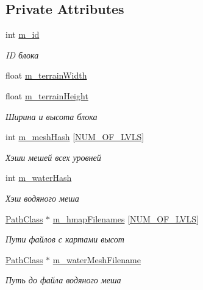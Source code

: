 \subsection*{Private Attributes}
\begin{DoxyCompactItemize}
\item 
int \hyperlink{class_terrain_class_aeeb736e6b77359830b252b74b1054945}{m\+\_\+id}
\begin{DoxyCompactList}\small\item\em ID блока \end{DoxyCompactList}\item 
float \hyperlink{class_terrain_class_a71a0f6882c7b84d5042ecfbe8ed30e7b}{m\+\_\+terrain\+Width}
\item 
float \hyperlink{class_terrain_class_aca2ee8ff8446e3730000ae32fdf46bd3}{m\+\_\+terrain\+Height}
\begin{DoxyCompactList}\small\item\em Ширина и высота блока \end{DoxyCompactList}\item 
int \hyperlink{class_terrain_class_a75f39c64ceade112a11343a6ff506693}{m\+\_\+mesh\+Hash} \mbox{[}\hyperlink{_terrain_class_8h_a5d0929f3af9dd1d7a4a73c1204046b3d}{N\+U\+M\+\_\+\+O\+F\+\_\+\+L\+V\+LS}\mbox{]}
\begin{DoxyCompactList}\small\item\em Хэши мешей всех уровней \end{DoxyCompactList}\item 
int \hyperlink{class_terrain_class_aafdee0e62a07b1eeb4d0d9dd47afb96f}{m\+\_\+water\+Hash}
\begin{DoxyCompactList}\small\item\em Хэш водяного меша \end{DoxyCompactList}\item 
\hyperlink{class_path_class}{Path\+Class} $\ast$ \hyperlink{class_terrain_class_aaf0664db56c7d377055a97a5558413f6}{m\+\_\+hmap\+Filenames} \mbox{[}\hyperlink{_terrain_class_8h_a5d0929f3af9dd1d7a4a73c1204046b3d}{N\+U\+M\+\_\+\+O\+F\+\_\+\+L\+V\+LS}\mbox{]}
\begin{DoxyCompactList}\small\item\em Пути файлов с картами высот \end{DoxyCompactList}\item 
\hyperlink{class_path_class}{Path\+Class} $\ast$ \hyperlink{class_terrain_class_a5f0e41791338175ddc7da7acc0c0d5b0}{m\+\_\+water\+Mesh\+Filename}
\begin{DoxyCompactList}\small\item\em Путь до файла водяного меша \end{DoxyCompactList}\item 

\end{DoxyCompactItemize}
